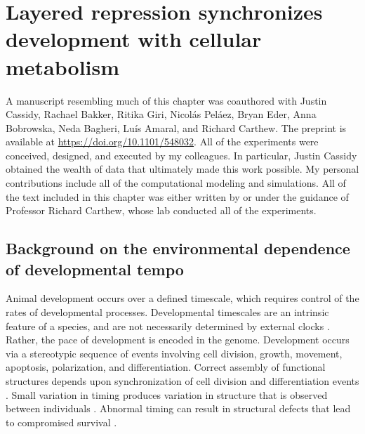 \graphicspath{ {figures/metabolism/} }


\chapter{Layered repression synchronizes development with cellular metabolism}
\label{ch:metabolism}

A manuscript resembling much of this chapter was coauthored with Justin Cassidy, Rachael Bakker, Ritika Giri, Nicol\'{a}s Pel\'{a}ez, Bryan Eder, Anna Bobrowska, Neda Bagheri, Lu\'{i}s Amaral, and Richard Carthew. The preprint is available at \url{https://doi.org/10.1101/548032}. All of the experiments were conceived, designed, and executed by my colleagues. In particular, Justin Cassidy obtained the wealth of data that ultimately made this work possible. My personal contributions include all of the computational modeling and simulations. All of the text included in this chapter was either written by or under the guidance of Professor Richard Carthew, whose lab conducted all of the experiments.


\section{Background on the environmental dependence of developmental tempo}

Animal development occurs over a defined timescale, which requires control of the rates of developmental processes. Developmental timescales are an intrinsic feature of a species, and are not necessarily determined by external clocks \cite{Ebisuya2018}. Rather, the pace of development is encoded in the genome. Development occurs via a stereotypic sequence of events involving cell division, growth, movement, apoptosis, polarization, and differentiation. Correct assembly of functional structures depends upon synchronization of cell division and differentiation events \cite{Foe1989,Sulston1983}. Small variation in timing produces variation in structure that is observed between individuals \cite{Francesconi2014,Poullet2016}. Abnormal timing can result in structural defects that lead to compromised survival \cite{Moss2007}.

